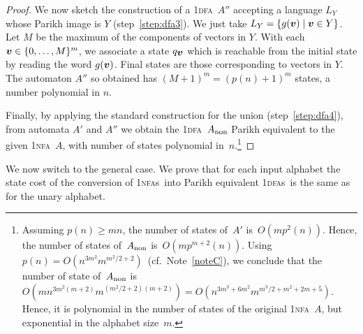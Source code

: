 \documentclass[11pt]{article}
\newcommand*{\ow}{\textsc{1}}
\newcommand*{\owdfa}{\ow\textsc{dfa}}
\newcommand*{\owdfas}{\ow\textsc{dfa}s}
\newcommand*{\ownfa}{\ow\textsc{nfa}}
\newcommand*{\ownfas}{\ow\textsc{nfa}s}
\def\Vec#1{\mbox{\boldmath $#1$}}
\begin{document}
\begin{proof}
\smallskip

We now sketch the construction of a \owdfa\ $A''$ accepting a language $L_Y$ whose Parikh image is $Y$
(step~\ref{step:dfa3}).
We just take $L_Y=\{g(\Vec{v})\mid\Vec{v}\in Y\}$. Let $M$ be the maximum of the components
of vectors in $Y$. With each $\Vec{v}\in\{0,\ldots,M\}^m$, we associate a state
$q_{\Vec{v}}$ which is reachable from the initial state by reading the word
$g(\Vec{v})$. Final states are those corresponding to vectors in $Y$.
The automaton $A''$ so obtained has $(M+1)^m=(p(n)+1)^m$ states, a number polynomial in $n$.

Finally, by applying the standard construction for the union (step~\ref{step:dfa4}), from automata $A'$ and $A''$
we obtain the \owdfa~$A_{\rm non}$ Parikh equivalent to the given \ownfa\ $A$,
with number of states polynomial in~$n$.\footnote{Assuming $p(n)\ge mn$, the number of states of~$A'$ is~$O(mp^2(n))$.
Hence, the number of states of~$A_{\rm non}$ is~$O(mp^{m+2}(n))$.
Using~$p(n)=O(n^{3m^2}m^{m^2/2+2})$~(cf.\ Note~\ref{noteC}), we conclude that the number of state
of~$A_{\rm non}$ is~$O(mn^{3m^2(m+2)}m^{(m^2/2+2)(m+2)}) = O(n^{3m^3+6m^2}m^{m^3/2+m^2+2m+5})$.
Hence, it is polynomial in the number of states of the original \ownfa~$A$,
but exponential in the alphabet size~$m$.\label{noteD}
}
\end{proof}

We now switch to the  general case. We prove that for each input alphabet
the state cost of the conversion of \ownfas\
into Parikh equivalent \owdfas\ is the same as for the unary alphabet.
\end{document}
